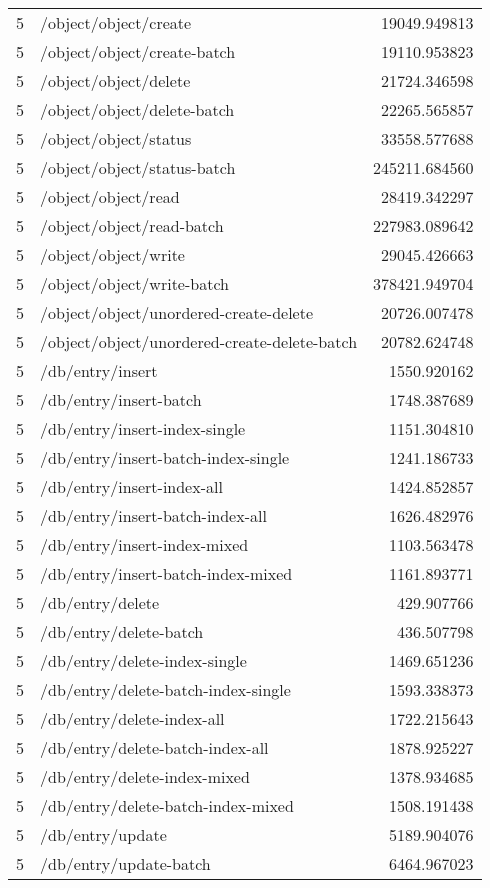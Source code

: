 \begin{longtable}{rlr}
5 & /object/object/create & 19049.949813 \\
5 & /object/object/create-batch & 19110.953823 \\
5 & /object/object/delete & 21724.346598 \\
5 & /object/object/delete-batch & 22265.565857 \\
5 & /object/object/status & 33558.577688 \\
5 & /object/object/status-batch & 245211.684560 \\
5 & /object/object/read & 28419.342297 \\
5 & /object/object/read-batch & 227983.089642 \\
5 & /object/object/write & 29045.426663 \\
5 & /object/object/write-batch & 378421.949704 \\
5 & /object/object/unordered-create-delete & 20726.007478 \\
5 & /object/object/unordered-create-delete-batch & 20782.624748 \\
5 & /db/entry/insert & 1550.920162 \\
5 & /db/entry/insert-batch & 1748.387689 \\
5 & /db/entry/insert-index-single & 1151.304810 \\
5 & /db/entry/insert-batch-index-single & 1241.186733 \\
5 & /db/entry/insert-index-all & 1424.852857 \\
5 & /db/entry/insert-batch-index-all & 1626.482976 \\
5 & /db/entry/insert-index-mixed & 1103.563478 \\
5 & /db/entry/insert-batch-index-mixed & 1161.893771 \\
5 & /db/entry/delete & 429.907766 \\
5 & /db/entry/delete-batch & 436.507798 \\
5 & /db/entry/delete-index-single & 1469.651236 \\
5 & /db/entry/delete-batch-index-single & 1593.338373 \\
5 & /db/entry/delete-index-all & 1722.215643 \\
5 & /db/entry/delete-batch-index-all & 1878.925227 \\
5 & /db/entry/delete-index-mixed & 1378.934685 \\
5 & /db/entry/delete-batch-index-mixed & 1508.191438 \\
5 & /db/entry/update & 5189.904076 \\
5 & /db/entry/update-batch & 6464.967023 \\

\end{longtable}
